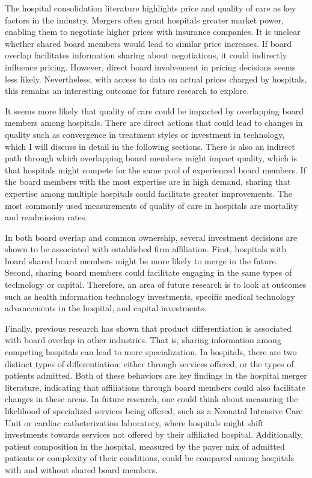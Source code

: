\documentclass[12pt]{article}
\begin{document}
    The hospital consolidation literature highlights price and quality of care as key factors in the industry. Mergers often grant hospitals greater market power, enabling them to negotiate higher prices with insurance companies. It is unclear whether shared board members would lead to similar price increases. If board overlap facilitates information sharing about negotiations, it could indirectly influence pricing. However, direct board involvement in pricing decisions seems less likely. Nevertheless, with access to data on actual prices charged by hospitals, this remains an interesting outcome for future research to explore.

    It seems more likely that quality of care could be impacted by overlapping board members among hospitals. There are direct actions that could lead to changes in quality such as convergence in treatment styles or investment in technology, which I will discuss in detail in the following sections. There is also an indirect path through which overlapping board members might impact quality, which is that hospitals might compete for the same pool of experienced board members. If the board members with the most expertise are in high demand, sharing that expertise among multiple hospitals could facilitate greater improvements. The most commonly used measurements of quality of care in hospitals are mortality and readmission rates. 

    In both board overlap and common ownership, several investment decisions are shown to be associated with established firm affiliation. First, hospitals with board shared board members might be more likely to merge in the future. Second, sharing board members could facilitate engaging in the same types of technology or capital. Therefore, an area of future research is to look at outcomes such as health information technology investments, specific medical technology advancements in the hospital, and capital investments. 

    Finally, previous research has shown that product differentiation is associated with board overlap in other industries. That is, sharing information among competing hospitals can lead to more specialization. In hospitals, there are two distinct types of differentiation: either through services offered, or the types of patients admitted. Both of these behaviors are key findings in the hospital merger literature, indicating that affiliations through board members could also facilitate changes in these areas. In future research, one could think about measuring the likelihood of specialized services being offered, such as a Neonatal Intensive Care Unit or cardiac catheterization laboratory, where hospitals might shift investments towards services not offered by their affiliated hospital. Additionally, patient composition in the hospital, measured by the payer mix of admitted patients or complexity of their conditions, could be compared among hospitals with and without shared board members. 
\end{document}
